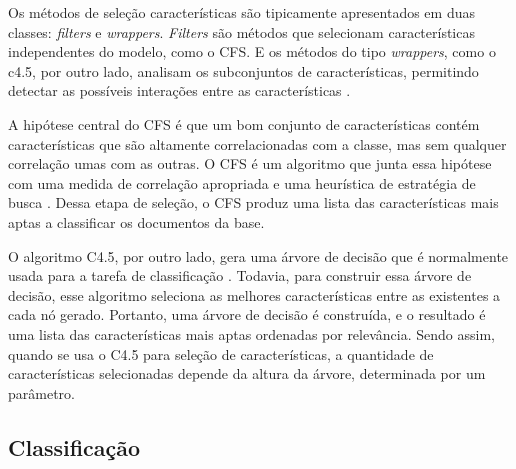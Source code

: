 \documentclass[template.tex]{subfiles}
\begin{document}


Os métodos de seleção características são tipicamente apresentados em duas classes: \textit{filters} e \textit{wrappers}. \textit{Filters} são métodos que selecionam características independentes do modelo, como o CFS. E os métodos do tipo \textit{wrappers}, como o c4.5, por outro lado, analisam os subconjuntos de características, permitindo detectar as possíveis interações entre as características \cite{guyon2003introduction}.

A hipótese central do CFS é que um bom conjunto de características contém características que são altamente correlacionadas com a classe, mas sem qualquer correlação umas com as outras. O CFS é um algoritmo que junta essa hipótese com uma medida de correlação apropriada e uma heurística de estratégia de busca \cite{hall1999correlation}. Dessa etapa de seleção, o CFS produz uma lista das características mais aptas a classificar os documentos da base. 

O algoritmo C4.5, por outro lado, gera uma árvore de decisão que é normalmente usada para a tarefa de classificação \cite{quinlan19934}. Todavia, para construir essa árvore de decisão, esse algoritmo seleciona as melhores características entre as existentes a cada nó gerado. Portanto, uma árvore de decisão é construída, e o resultado é uma lista das características mais aptas ordenadas por relevância. Sendo assim, quando se usa o C4.5 para seleção de características, a quantidade de características selecionadas depende da altura da árvore, determinada por um parâmetro.

\subsection{Classificação}

%
%
%
%
%
\end{document}
